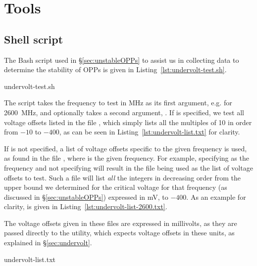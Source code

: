 \section{Tools}
\label{sec:tools}

\subsection{Shell script}
\label{sec:undervolt-test.sh}

The Bash script used in §\ref{sec:unstableOPPs} to assist us in collecting data
to determine the stability of OPPs is given in Listing~\ref{lst:undervolt-test.sh}.


    {undervolt-test.sh}

The script takes the frequency to test in MHz as its first argument, e.g.
 for 2600~MHz, and optionally takes a second argument, .
If  is specified, we test all voltage offsets listed in the file
, which simply lists all the multiples of 10 in order
from $-10$ to $-400$, as can be seen in Listing~\ref{lst:undervolt-list.txt}
for clarity.

If  is not specified, a list of voltage offsets specific
to the given frequency is used, as found in the file
, where  is the given
frequency. For example, specifying  as the frequency and not
specifying  will result in the file 
being used as the list of voltage offsets to test. Such a file will list
\emph{all} the integers in decreasing order from the upper bound we determined
for the critical voltage for that frequency (as discussed in §\ref{sec:unstableOPPs})
expressed in mV, to $-400$.
As an example for clarity,  is given in
Listing~\ref{lst:undervolt-list-2600.txt}.

The voltage offsets given in these files are expressed in millivolts, as they
are passed directly to the  utility, which expects voltage
offsets in these units, as explained in §\ref{sec:undervolt}.


    {undervolt-list.txt}

